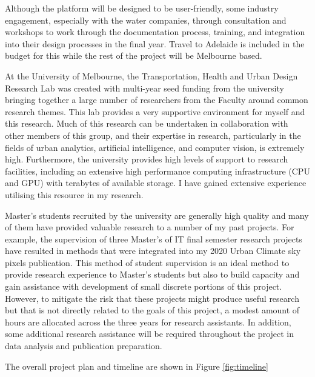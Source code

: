 Although the platform will be designed to be user-friendly, some industry engagement, especially with the water companies, through consultation and workshops to work through the documentation process, training, and integration into their design processes in the final year. Travel to Adelaide is included in the budget for this while the rest of the project will be Melbourne based.

At the University of Melbourne, the Transportation, Health and Urban Design Research Lab was created with multi-year seed funding from the university bringing together a large number of researchers from the Faculty around common research themes. This lab provides a very supportive environment for myself and this research. Much of this research can be undertaken in collaboration with other members of this group, and their expertise in research, particularly in the fields of urban analytics, artificial intelligence, and computer vision, is extremely high. Furthermore, the university provides high levels of support to research facilities, including an extensive high performance computing infrastructure (CPU and GPU) with terabytes of available storage. I have gained extensive experience utilising this resource in my research. 

Master's students recruited by the university are generally high quality and many of them have provided valuable research to a number of my past projects. For example, the supervision of three Master's of IT final semester research projects have resulted in methods that were integrated into my 2020 Urban Climate sky pixels publication\cite{Nice2020}. This method of student supervision is an ideal method to provide research experience to Master's students but also to build capacity and gain assistance with development of small discrete portions of this project. However, to mitigate the risk that these projects might produce useful research but that is not directly related to the goals of this project, a modest amount of hours are allocated across the three years for research assistants. In addition, some additional research assistance will be required throughout the project in data analysis and publication preparation.

The overall project plan and timeline are shown in Figure \ref{fig:timeline}

